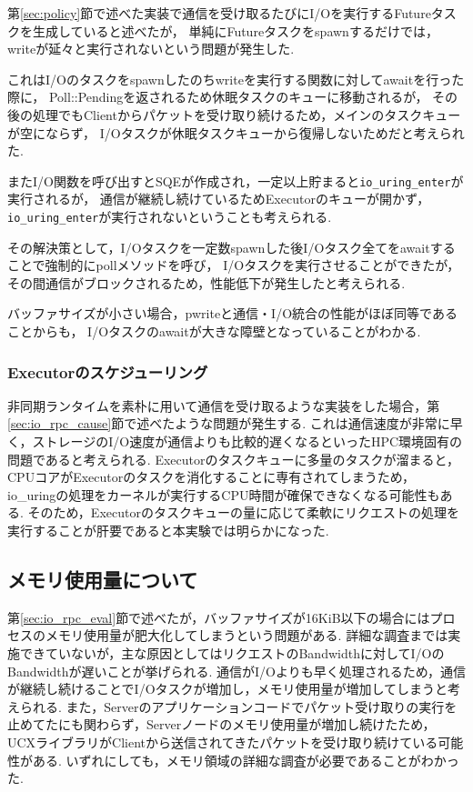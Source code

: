 \documentclass[a4paper,11pt,openany]{jreport}
\begin{document}
第\ref{sec:policy}節で述べた実装で通信を受け取るたびにI/Oを実行するFutureタスクを生成していると述べたが，
単純にFutureタスクをspawnするだけでは，writeが延々と実行されないという問題が発生した.

これはI/Oのタスクをspawnしたのちwriteを実行する関数に対してawaitを行った際に，
Poll::Pendingを返されるため休眠タスクのキューに移動されるが，
その後の処理でもClientからパケットを受け取り続けるため，メインのタスクキューが空にならず，
I/Oタスクが休眠タスクキューから復帰しないためだと考えられた.

またI/O関数を呼び出すとSQEが作成され，一定以上貯まると\lstinline|io_uring_enter|が実行されるが，
通信が継続し続けているためExecutorのキューが開かず，\lstinline|io_uring_enter|が実行されないということも考えられる.

その解決策として，I/Oタスクを一定数spawnした後I/Oタスク全てをawaitすることで強制的にpollメソッドを呼び，
I/Oタスクを実行させることができたが，その間通信がブロックされるため，性能低下が発生したと考えられる.

バッファサイズが小さい場合，pwriteと通信・I/O統合の性能がほぼ同等であることからも，
I/Oタスクのawaitが大きな障壁となっていることがわかる.

\subsubsection{Executorのスケジューリング}
非同期ランタイムを素朴に用いて通信を受け取るような実装をした場合，第\ref{sec:io_rpc_cause}節で述べたような問題が発生する.
これは通信速度が非常に早く，ストレージのI/O速度が通信よりも比較的遅くなるといったHPC環境固有の問題であると考えられる.
Executorのタスクキューに多量のタスクが溜まると，CPUコアがExecutorのタスクを消化することに専有されてしまうため，
io\_uringの処理をカーネルが実行するCPU時間が確保できなくなる可能性もある.
そのため，Executorのタスクキューの量に応じて柔軟にリクエストの処理を実行することが肝要であると本実験では明らかになった.

\subsection{メモリ使用量について}
第\ref{sec:io_rpc_eval}節で述べたが，バッファサイズが16KiB以下の場合にはプロセスのメモリ使用量が肥大化してしまうという問題がある.
詳細な調査までは実施できていないが，主な原因としてはリクエストのBandwidthに対してI/OのBandwidthが遅いことが挙げられる.
通信がI/Oよりも早く処理されるため，通信が継続し続けることでI/Oタスクが増加し，メモリ使用量が増加してしまうと考えられる.
また，Serverのアプリケーションコードでパケット受け取りの実行を止めてたにも関わらず，Serverノードのメモリ使用量が増加し続けたため，
UCXライブラリがClientから送信されてきたパケットを受け取り続けている可能性がある.
いずれにしても，メモリ領域の詳細な調査が必要であることがわかった.
\end{document}
